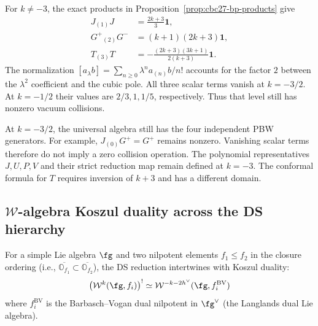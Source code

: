 \begin{computation}
\label{comp:bp-bar}
For $k\ne-3$, the exact products in Proposition~\ref{prop:cbc27-bp-products} give
\begin{align}
 J_{(1)}J&=\frac{2k+3}{3}\mathbf1,\label{eq:bp-curv-sl2}\\
 G^+{}_{(2)}G^-&=(k+1)(2k+3)\mathbf1,\label{eq:bp-curv-G}\\
 T_{(3)}T&=-\frac{(2k+3)(3k+1)}{2(k+3)}\mathbf1.
\end{align}
The normalization $[a_\lambda b]=\sum_{n\geq0}\lambda^na_{(n)}b/n!$
accounts for the factor $2$ between the $\lambda^2$ coefficient and the cubic pole.
All three scalar terms vanish at $k=-3/2$.
At $k=-1/2$ their values are $2/3,1,1/5$, respectively.
Thus that level still has nonzero vacuum collisions.

At $k=-3/2$, the universal algebra still has the four independent PBW generators.
For example, $J_{(0)}G^+=G^+$ remains nonzero.
Vanishing scalar terms therefore do not imply a zero collision operation.
The polynomial representatives $J,U,P,V$ and their strict reduction map remain defined at $k=-3$.
The conformal formula for $T$ requires inversion of $k+3$ and has a different domain.
\end{computation}


\subsection{$\mathcal{W}$-algebra Koszul duality across the DS hierarchy}
\label{sec:ds-hierarchy-koszul}

\begin{proposition}
\label{prop:ds-koszul-hierarchy}
For a simple Lie algebra $\fg$ and two nilpotent elements
$f_1 \leq f_2$ in the closure ordering (i.e.,
$\overline{\mathbb{O}_{f_1}} \subset \overline{\mathbb{O}_{f_2}}$),
the DS reduction intertwines with Koszul duality:
\[
\bigl(\mathcal{W}^k(\fg, f_i)\bigr)^!
\simeq \mathcal{W}^{-k-2h^\vee}(\fg, f_i^{\mathrm{BV}})
\]
where $f_i^{\mathrm{BV}}$ is the Barbasch--Vogan dual nilpotent
in $\fg^\vee$ (the Langlands dual Lie algebra).
\end{proposition}

